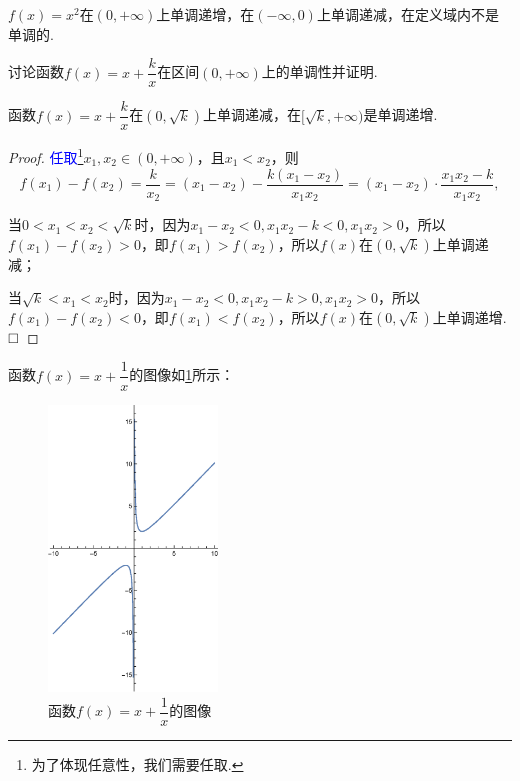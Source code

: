 \documentclass[lang=cn,math=cm,chinesefont=nofont,11pt,scheme=chinese,twocol]{elegantbook}
\begin{document}
\begin{example}
  $f(x)=x^2$在$(0,+\infty)$上单调递增，在$(-\infty,0)$上单调递减，在定义域内不是单调的.
\end{example}

\begin{spacing}{1.8}
  \begin{example}
    讨论函数$f(x)=x+\dfrac{k}{x}$在区间$(0,+\infty)$上的单调性并证明.
  \end{example}

  \begin{solution}
    函数$f(x)=x+\dfrac{k}{x}$在$(0,\sqrt{k})$上单调递减，在$[\sqrt{k},+\infty)$是单调递增.
  \end{solution}

  \begin{proof}
    \textcolor{blue}{任取}\footnote{为了体现任意性，我们需要任取.}$x_1,x_2\in (0,+\infty)$，且$x_1<x_2$，则$$f(x_1)-f(x_2)=\dfrac{k}{x_2}=(x_1-x_2)-\dfrac{k(x_1-x_2)}{x_1 x_2}=(x_1-x_2)\cdot \dfrac{x_1x_2-k}{x_1x_2},$$

    当$0<x_1<x_2<\sqrt{k}$时，因为$x_1-x_2<0,x_1x_2-k<0,x_1x_2>0$，所以$f(x_1)-f(x_2)>0$，即$f(x_1)>f(x_2)$，所以$f(x)$在$(0,\sqrt{k})$上单调递减；

    当$\sqrt{k}<x_1<x_2$时，因为$x_1-x_2<0,x_1x_2-k>0,x_1x_2>0$，所以$f(x_1)-f(x_2)<0$，即$f(x_1)<f(x_2)$，所以$f(x)$在$(0,\sqrt{k})$上单调递增.$\hfill\square$
  \end{proof}

\end{spacing}

\begin{remark}
  函数$f(x)=x+\dfrac{1}{x}$的图像如\ref{img:2.2.2function}所示：
\end{remark}

\begin{figure}[h]
  \centering
  \includegraphics[width=0.4\textwidth]{image/2.2.2function.eps}
  \caption{函数$f(x)=x+\dfrac{1}{x}$的图像}
  \label{img:2.2.2function}
\end{figure}
\end{document}

